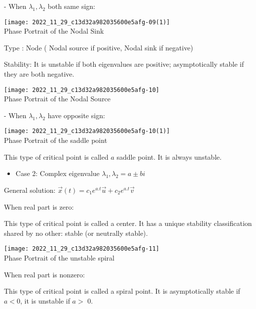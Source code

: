 \documentclass[a4paper]{article}
\begin{document}
- When $\lambda_{1}, \lambda_{2}$ both same sign:


\begin{center}
	\texttt{[image: 2022\_11\_29\_c13d32a982035600e5afg-09(1)]}\\
	Phase Portrait of the Nodal Sink
\end{center}



Type : Node ( Nodal source if positive, Nodal sink if negative)

Stability: It is unstable if both eigenvalues are positive; asymptotically stable if they are both negative.

\begin{center}
	\texttt{[image: 2022\_11\_29\_c13d32a982035600e5afg-10]}\\
	Phase Portrait of the Nodal Source
\end{center}


- When $\lambda_{1}, \lambda_{2}$ have opposite sign:


\begin{center}
	\texttt{[image: 2022\_11\_29\_c13d32a982035600e5afg-10(1)]}\\
	Phase Portrait of the saddle point
\end{center}



This type of critical point is called $a$ saddle point. It is always unstable.

\begin{itemize}
	\item Case 2: Complex eigenvalue $\lambda_{1}, \lambda_{2}=a \pm b i$
\end{itemize}

General solution: $\vec{x}(t)=c_{1} e^{a . t} \vec{u}+c_{2} e^{a . t} \vec{v}$

When real part is zero:

This type of critical point is called a center. It has a unique stability classification shared by no other: stable (or neutrally stable).

\begin{center}
	\texttt{[image: 2022\_11\_29\_c13d32a982035600e5afg-11]}\\
	Phase Portrait of the unstable spiral
\end{center}



When real part is nonzero:

This type of critical point is called a spiral point. It is asymptotically stable if $a<0$, it is unstable if $a>$ 0.
\end{document}

